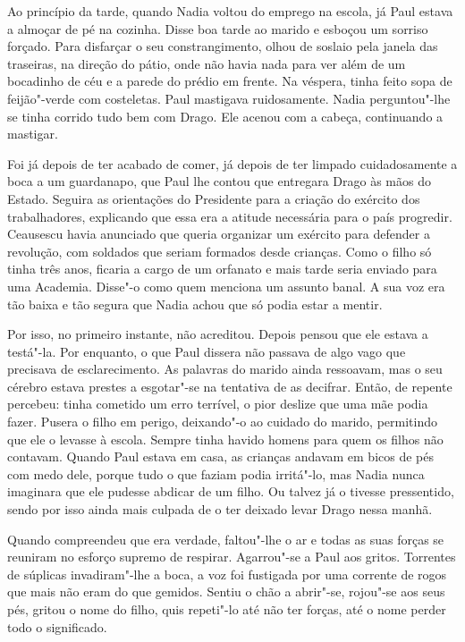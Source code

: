 Ao princípio da tarde, quando Nadia voltou do emprego na escola, já Paul
estava a almoçar de pé na cozinha. Disse boa tarde ao marido e esboçou
um sorriso forçado. Para disfarçar o seu constrangimento, olhou de
soslaio pela janela das traseiras, na direção do pátio, onde não havia
nada para ver além de um bocadinho de céu e a parede do prédio em
frente. Na véspera, tinha feito sopa de feijão"-verde com costeletas. Paul mastigava ruidosamente. Nadia perguntou"-lhe
se tinha corrido tudo bem com Drago. Ele acenou com a cabeça,
continuando a mastigar.

Foi já depois de ter acabado de comer, já depois de ter limpado
cuidadosamente a boca a um guardanapo, que Paul lhe contou que entregara %
Drago às mãos do Estado. Seguira as orientações do Presidente para a
criação do exército dos trabalhadores, explicando que essa era a atitude necessária para o país progredir. Ceausescu havia anunciado que
queria organizar um exército para defender a revolução, com soldados que
seriam formados desde crianças. Como o filho só tinha três anos, ficaria
a cargo de um orfanato e mais tarde seria enviado para uma Academia.
Disse"-o como quem menciona um assunto banal. A sua voz era tão baixa e
tão segura que Nadia achou que só podia estar a mentir.

Por isso, no primeiro instante, não acreditou. Depois
pensou que ele estava a testá"-la. Por enquanto, o que Paul dissera não
passava de algo vago que precisava de esclarecimento. As palavras do
marido ainda ressoavam, mas o seu cérebro estava prestes a esgotar"-se na
tentativa de as decifrar. Então, de repente percebeu: tinha cometido um
erro terrível, o pior deslize que uma mãe podia fazer.
Pusera o filho em perigo, deixando"-o ao cuidado do marido, permitindo
que ele o levasse à escola. Sempre tinha havido homens para quem os
filhos não contavam. Quando Paul estava em casa, as crianças andavam em
bicos de pés com medo dele, porque tudo o que faziam podia irritá"-lo,
mas Nadia nunca imaginara que ele pudesse abdicar de um filho. Ou talvez
já o tivesse pressentido, sendo por isso ainda mais culpada de o ter
deixado levar Drago nessa manhã.

Quando compreendeu que era verdade, faltou"-lhe o ar e todas as suas
forças se reuniram no esforço supremo de respirar. Agarrou"-se a Paul aos
gritos. Torrentes de súplicas invadiram"-lhe a boca, a voz foi fustigada
por uma corrente de rogos que mais não eram do que gemidos. Sentiu o
chão a abrir"-se, rojou"-se aos seus pés, gritou o nome do filho, quis
repeti"-lo até não ter forças, até o nome perder todo o significado.

